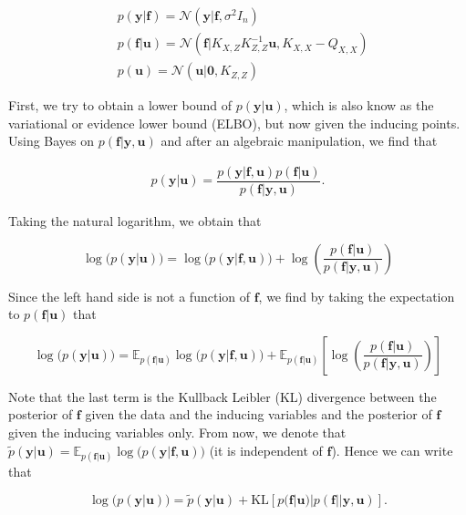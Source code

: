 \documentclass[12pt,a4paper,oneside]{book}
\begin{document}
\begin{equation}\label{variational_start}
\begin{aligned}
&p(\bm{y}|\bm{f}) = \mathcal{N}(\bm{y} | \bm{f}, \sigma^2 I_n) \\
&p(\bm{f}|\bm{u}) = \mathcal{N} (\bm{f}|K_{X,Z} K^{-1}_{Z,Z} \bm{u} , K_{X,X} - Q_{X,X}) \\
&p(\bm{u}) = \mathcal{N}( \bm{u} | \bm{0}, K_{Z,Z})
\end{aligned}
\end{equation}

First, we try to obtain a lower bound of $p(\bm{y}|\bm{u})$, which is also know as the variational or evidence lower bound (ELBO), but now given the inducing points. Using Bayes on ${p(\bm{f}|\bm{y},\bm{u})}$ and after an algebraic manipulation, we find that

\begin{align}
p(\bm{y}|\bm{u}) = \dfrac{p(\bm{y}|\bm{f}, \bm{u})p(\bm{f}|\bm{u})}{p(\bm{f}|\bm{y},\bm{u})}.
\end{align}

Taking the natural logarithm, we obtain that

\begin{equation}
\log{(p(\bm{y}|\bm{u})}) = \log{(p(\bm{y}|\bm{f}, \bm{u})}) + \log{\left(\dfrac{p(\bm{f}|\bm{u})}{p(\bm{f}|\bm{y},\bm{u})}\right)}
\end{equation}

Since the left hand side is not a function of $\bm{f}$, we find by taking the expectation to $p(\bm{f}|\bm{u})$ that 

\begin{equation}\label{sparse_var_1}
\log{(p(\bm{y}|\bm{u})}) = \mathbb{E}_{p(\bm{f}|\bm{u})}\log{(p(\bm{y}|\bm{f}, \bm{u})}) + \mathbb{E}_{p(\bm{f}|\bm{u})} \left[ \log{\left(\dfrac{p(\bm{f}|\bm{u})}{p(\bm{f}|\bm{y},\bm{u})}\right)} \right]
\end{equation}

Note that the last term is the Kullback Leibler (KL) divergence between the posterior of $\bm{f}$ given the data and the
inducing variables and the posterior of $\bm{f}$ given the inducing variables only. From now, we denote that $ \tilde{p}(\bm{y}|\bm{u}) = \mathbb{E}_{p(\bm{f}|\bm{u})}\log{(p(\bm{y}|\bm{f}, \bm{u})})$ (it is independent of $\bm{f}$). Hence we can write that 

\begin{equation}\label{sparse_var_5}
\log{(p(\bm{y}|\bm{u})}) = \tilde{p}(\bm{y}|\bm{u}) + \text{KL}[p(\bm{f}|\bm{u})|p(\bm{f}||\bm{y},\bm{u})].
\end{equation}
\end{document}
